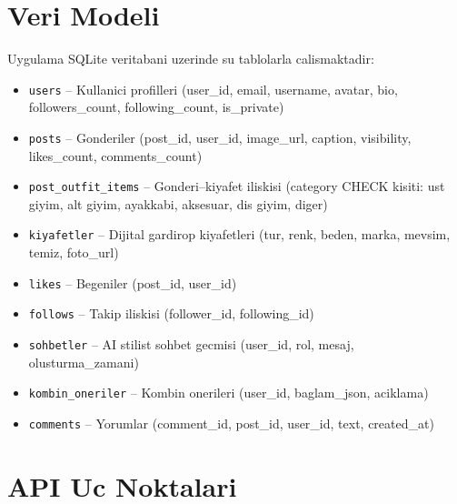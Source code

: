 \documentclass[conference]{IEEEtran}
\begin{document}
\section{Veri Modeli}

Uygulama SQLite veritabani uzerinde su tablolarla calismaktadir:

\begin{itemize}
  \item \texttt{users} -- Kullanici profilleri (user\_id, email, username, avatar, bio, followers\_count, following\_count, is\_private)
  \item \texttt{posts} -- Gonderiler (post\_id, user\_id, image\_url, caption, visibility, likes\_count, comments\_count)
  \item \texttt{post\_outfit\_items} -- Gonderi--kiyafet iliskisi (category CHECK kisiti: ust giyim, alt giyim, ayakkabi, aksesuar, dis giyim, diger)
  \item \texttt{kiyafetler} -- Dijital gardirop kiyafetleri (tur, renk, beden, marka, mevsim, temiz, foto\_url)
  \item \texttt{likes} -- Begeniler (post\_id, user\_id)
  \item \texttt{follows} -- Takip iliskisi (follower\_id, following\_id)
  \item \texttt{sohbetler} -- AI stilist sohbet gecmisi (user\_id, rol, mesaj, olusturma\_zamani)
  \item \texttt{kombin\_oneriler} -- Kombin onerileri (user\_id, baglam\_json, aciklama)
  \item \texttt{comments} -- Yorumlar (comment\_id, post\_id, user\_id, text, created\_at)
\end{itemize}

\section{API Uc Noktalari}
\end{document}
